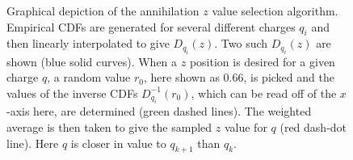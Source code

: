 \documentclass[superscriptaddress,aps,prb,11pt]{revtex4-1}
\begin{document}
\begin{figure}
  \centering
  \caption{Graphical depiction of the annihilation $z$ value selection algorithm.  Empirical CDFs are generated for several different charges $q_i$ and then linearly interpolated to give $D_{q_i}(z)$.  Two such $D_{q_i}(z)$ are shown (blue solid curves).  When a $z$ position is desired for a given charge $q$, a random value $r_0$, here shown as 0.66, is picked and the values of the inverse CDFs $D^{-1}_{q_i}(r_0)$, which can be read off of the $x$-axis here, are determined (green dashed lines).  The weighted average is then taken to give the sampled $z$ value for $q$ (red dash-dot line).  Here $q$ is closer in value to $q_{k+1}$ than $q_k$.}
  \label{fig:z_interpolation}
\end{figure}
\end{document}
